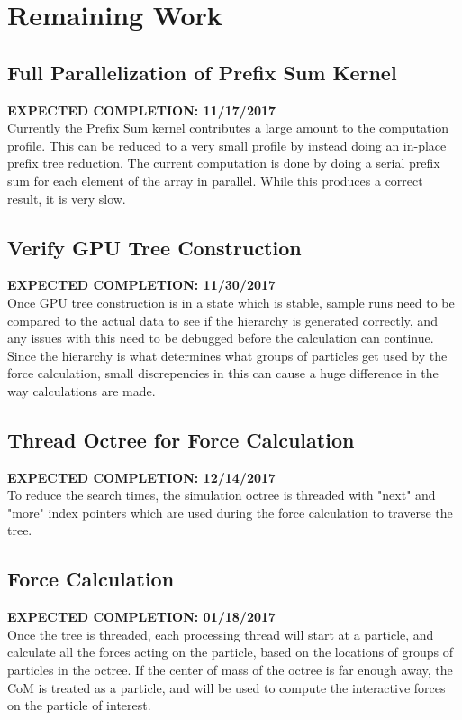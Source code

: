 \documentclass[fleqn,10pt]{SelfArx} %
\begin{document}

\section{Remaining Work}

\subsection{Full Parallelization of Prefix Sum Kernel}
\textbf{EXPECTED COMPLETION: 11/17/2017}\\
Currently the Prefix Sum kernel contributes a large amount to the computation profile. This can be reduced to a very small profile by instead doing an in-place prefix tree reduction. The current computation is done by doing a serial prefix sum for each element of the array in parallel. While this produces a correct result, it is very slow.

\subsection{Verify GPU Tree Construction}
\textbf{EXPECTED COMPLETION: 11/30/2017}\\
Once GPU tree construction is in a state which is stable, sample runs need to be compared to the actual data to see if the hierarchy is generated correctly, and any issues with this need to be debugged before the calculation can continue. Since the hierarchy is what determines what groups of particles get used by the force calculation, small discrepencies in this can cause a huge difference in the way calculations are made.

\subsection{Thread Octree for Force Calculation}
\textbf{EXPECTED COMPLETION: 12/14/2017}\\
To reduce the search times, the simulation octree is threaded with "next" and "more" index pointers which are used during the force calculation to traverse the tree. 


\subsection{Force Calculation}
\textbf{EXPECTED COMPLETION: 01/18/2017}\\
Once the tree is threaded, each processing thread will start at a particle, and calculate all the forces acting on the particle, based on the locations of groups of particles in the octree. If the center of mass of the octree is far enough away, the CoM is treated as a particle, and will be used to compute the interactive forces on the particle of interest.
\end{document}
